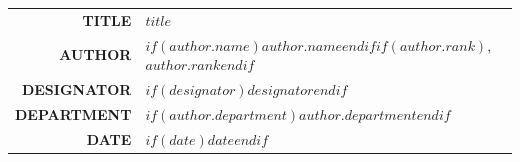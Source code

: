 \documentclass[12pt,a4paper,oneside]{letter}
\begin{document}

%

{%
\centering
\begin{tabular}{r|l}
\bf\large{TITLE}& $title$\\[2pt] 
\bf\large{AUTHOR}& $if(author.name)$$author.name$$endif$$if(author.rank)$, $author.rank$$endif$\\[2pt]
\bf\large{DESIGNATOR}& $if(designator)$$designator$$endif$\\[2pt]
\bf\large{DEPARTMENT}& $if(author.department)$$author.department$$endif$\\[2pt]
\bf\large{DATE}& $if(date)$$date$$endif$
\end{tabular}\par
}

%
\vspace{20pt}
\end{document}
